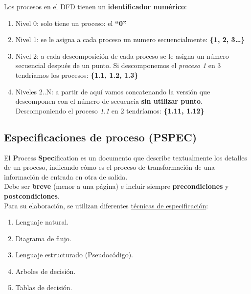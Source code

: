 Los procesos en el DFD tienen un \textbf{identificador numérico}:
\begin{enumerate}
    \item Nivel 0: solo tiene un proceso: el \textbf{``0''}
    \item Nivel 1: se le asigna a cada proceso un numero secuencialmente: \textbf{\{1, 2, 3\ldots\}}
    \item Nivel 2: a cada descomposición de cada proceso se le asigna un número secuencial después de un punto. Si descomponemos el \textit{proceso 1} en 3 tendríamos los procesos: \textbf{\{1.1, 1.2, 1.3\}}
    \item Niveles 2..N: a partir de aquí vamos concatenando la versión que descomponen con el número de secuencia \textbf{sin utilizar punto}. Descomponiendo el proceso \textit{1.1} en 2 tendríamos: \textbf{\{1.11, 1.12\}}
\end{enumerate}




\subsection{Especificaciones de proceso (PSPEC)} %
El \textbf{P}rocess \textbf{Spec}ification es un documento que describe textualmente los detalles de un proceso, indicando cómo es el proceso de transformación de una información de entrada en otra de salida. 
\\
Debe ser \textbf{breve} (menor a una página) e incluir siempre \textbf{precondiciones} y \textbf{postcondiciones}.
\\
Para su elaboración, se utilizan diferentes \uline{técnicas de especificación}:

\begin{enumerate}
    \item Lenguaje natural.
    \item Diagrama de flujo.
    \item Lenguaje estructurado (Pseudocódigo).
    \item Arboles de decisión.
    \item Tablas de decisión.
\end{enumerate}


